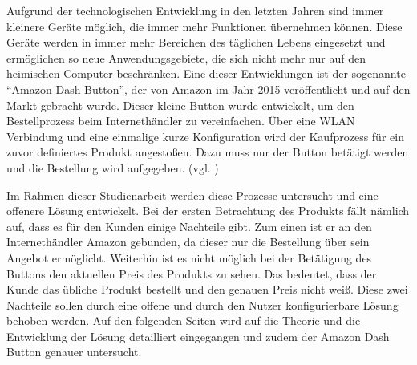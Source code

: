 Aufgrund der technologischen Entwicklung in den letzten Jahren sind immer kleinere Geräte möglich, die immer mehr Funktionen übernehmen können. Diese Geräte werden in immer mehr Bereichen des täglichen Lebens eingesetzt und ermöglichen so neue Anwendungsgebiete, die sich nicht mehr nur auf den heimischen Computer beschränken. Eine dieser Entwicklungen ist der sogenannte ``Amazon Dash Button'', der von Amazon im Jahr 2015 veröffentlicht und auf den Markt gebracht wurde. 
Dieser kleine Button wurde entwickelt, um den Bestellprozess beim Internethändler zu vereinfachen. Über eine WLAN Verbindung und eine einmalige kurze Konfiguration wird der Kaufprozess für ein zuvor definiertes Produkt angestoßen. Dazu muss nur der Button betätigt werden und die Bestellung wird aufgegeben. (vgl. \cite{Amazon.})

Im Rahmen dieser Studienarbeit werden diese Prozesse untersucht und eine offenere Lösung entwickelt. Bei der ersten Betrachtung des Produkts fällt nämlich auf, dass es für den Kunden einige Nachteile gibt. Zum einen ist er an den Internethändler Amazon gebunden, da dieser nur die Bestellung über sein Angebot ermöglicht. Weiterhin ist es nicht möglich bei der Betätigung des Buttons den aktuellen Preis des Produkts zu sehen. Das bedeutet, dass der Kunde das übliche Produkt bestellt und den genauen Preis nicht weiß. Diese zwei Nachteile sollen durch eine offene und durch den Nutzer konfigurierbare Lösung behoben werden. Auf den folgenden Seiten wird auf die Theorie und die Entwicklung der Lösung detailliert eingegangen und zudem der Amazon Dash Button genauer untersucht.